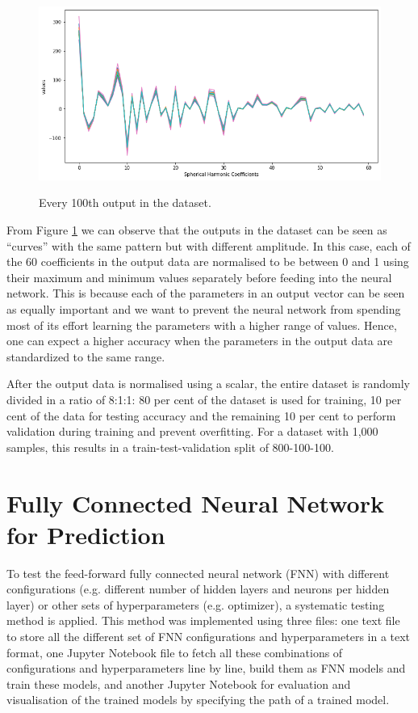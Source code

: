 \begin{figure}[H]
    \centering
    \caption{Every 100th output in the dataset.}
    \includegraphics[scale=0.5]{figures/geoid_images/Geoid_sample_output.png}
    \label{figure:geoid_output}
\end{figure}

From Figure \ref{figure:geoid_output} we can observe that the outputs in the dataset can be seen as ``curves'' with the same pattern but with different amplitude. In this case, each of the 60 coefficients in the output data are normalised to be between 0 and 1 using their maximum and minimum values separately before feeding into the neural network. This is because each of the parameters in an output vector can be seen as equally important and we want to prevent the neural network from spending most of its effort learning the parameters with a higher range of values. Hence, one can expect a higher accuracy when the parameters in the output data are standardized to the same range.

After the output data is normalised using a scalar, the entire dataset is randomly divided in a ratio of 8:1:1: 80 per cent of the dataset is used for training, 10 per cent of the data for testing accuracy and the remaining 10 per cent to perform validation during training and prevent overfitting. For a dataset with 1,000 samples, this results in a train-test-validation split of 800-100-100.

\section{Fully Connected Neural Network for Prediction}

To test the feed-forward fully connected neural network (FNN) with different configurations (e.g. different number of hidden layers and neurons per hidden layer) or other sets of hyperparameters (e.g. optimizer), a systematic testing method is applied. This method was implemented using three files: one text file to store all the different set of FNN configurations and hyperparameters in a text format, one Jupyter Notebook file to fetch all these combinations of configurations and hyperparameters line by line, build them as FNN models and train these models, and another Jupyter Notebook for evaluation and visualisation of the trained models by specifying the path of a trained model.

